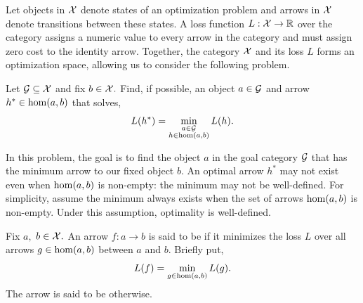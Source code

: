 \documentclass[a4paper]{ifacconf}
\begin{document}
Let objects in \(\mathcal{X}\) denote states of an optimization problem and arrows in \(\mathcal{X}\) denote transitions between these states.
A loss function \(L: \mathcal{X} \to \mathbb{R}\) over the category assigns a numeric value to every arrow in the category and must assign zero cost to the identity arrow.
Together, the category \(\mathcal{X}\) and its loss \(L\) forms an optimization space, allowing us to consider the following problem.
%

%
%
\begin{prob}
  \label{prob:optimal-arrow}
  Let \(\mathcal{G} \subseteq \mathcal{X}\) and fix \(b \in \mathcal{X}.\)
  Find, if possible, an object \(a \in \mathcal{G}\) and arrow \(h^* \in \mathrm{hom}(a, b)\) that solves,
  \[
    L(h^*) = 
      \min_{%
        \begin{subarray}{c}
          a \in \Category{G}\\ 
          h \in \HomSet(a, b)
        \end{subarray}%
      } L(h).
  \]
\end{prob}
%
In this problem, the goal is to find the object \(a\) in the goal category \(\mathcal{G}\) that has the minimum arrow to our fixed object \(b.\)
An optimal arrow \(h^*\) may not exist even when \(\mathrm{hom}(a, b)\) is non-empty:
the minimum may not be well-defined.
For simplicity, assume the minimum always exists when the set of arrows \(\mathrm{hom}(a, b)\) is non-empty.
Under this assumption, optimality is well-defined.
%
\begin{defn}
  Fix \(a,\) \(b \in \mathcal{X}.\)
  An arrow \(f: a\to b\) is said to be  if it minimizes the loss \(L\) over all arrows \(g \in \mathrm{hom}(a, b)\) between \(a\) and \(b.\)
  Briefly put,
  \[
    L(f) = \min_{g \in \mathrm{hom}(a, b)} L(g).
  \]
  The arrow is said to be  otherwise.
\end{defn}
\end{document}
